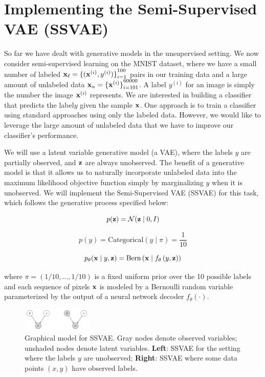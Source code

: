 \section{Implementing the Semi-Supervised VAE (SSVAE)}

So far we have dealt with generative models in the unsupervised setting. We now consider semi-supervised learning on the 
MNIST dataset, where we have a small number of labeled $\mathbf{x}_{\ell} = {\{(\mathbf{x}^{(i)},y^{(i)})\}}_{i=1}^{100}$ pairs in our 
training data and a large amount of unlabeled data $\mathbf{x}_{u} = {\{\mathbf{x}^{(i)}\}}_{i=101}^{60000}$. A label $y^{(i)}$ for an 
image is simply the number the image $\mathbf{x}^{(i)}$ represents. We are interested in building a classifier that predicts the 
label$y$ given the sample $\mathbf{x}$. One approach is to train a classifier using standard approaches using only the labeled data. 
However, we would like to leverage the large amount of unlabeled data that we have to improve our classifier’s performance.

We will use a latent variable generative model (a VAE), where the labels $y$ are partially observed, and $\mathbf{z}$ are always unobserved. 
The benefit of a generative model is that it allows us to naturally incorporate unlabeled data into the maximum likelihood 
objective function simply by marginalizing $y$ when it is unobserved. We will implement the Semi-Supervised VAE (SSVAE) 
for this task, which follows the generative process specified below:

\begin{equation}\label{eq:15}
    p(\mathbf{z}) = \mathcal{N}(\mathbf{z} \mid 0, I)
\end{equation}


\begin{equation} \label{eq:16}
    p(y) = \text{Categorical}(y \mid \pi) = \frac{1}{10}
\end{equation}

\begin{equation} \label{eq:17}
    p_{\theta}(\mathbf{x} \mid y, \mathbf{z}) = \text{Bern}\left(\mathbf{x} \mid f_{\theta}\left(y,\mathbf{z}\right)\right)
\end{equation}

where $\pi = (1/10,...,1/10)$ is a fixed uniform prior over the 10 possible labels and each sequence of pixels $\mathbf{x}$ is 
modeled by a Bernoulli random variable parameterized by the output of a neural network decoder $f_{\theta}(\cdot)$.

\begin{figure}[h]
    \centering
    \includegraphics[width=0.3\textwidth]{./figures/ssvae}
    \caption{Graphical model for SSVAE. Gray nodes denote observed variables; unshaded nodes denote latent variables. \textbf{Left}: SSVAE for the setting where the labels $y$ are unobserved; \textbf{Right}: SSVAE where some data points $(x, y)$ have observed labels.}
    \label{fig:ssvae}
\end{figure}

